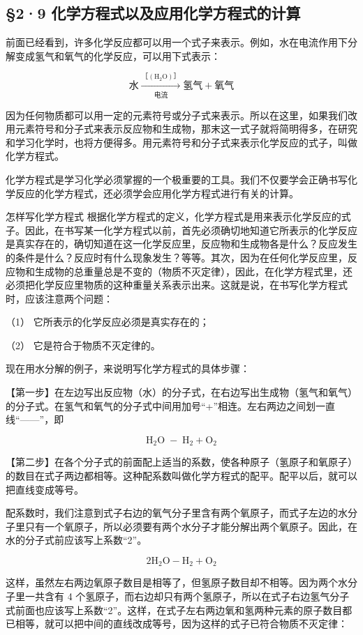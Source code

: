 \subsection{§2·9 化学方程式以及应用化学方程式的计算}

前面已经看到，许多化学反应都可以用一个式子来表示。例如，水在电流作用下分解变成氢气和氧气的化学反应，可以用下式表示：

\[
\text{水} \xrightarrow[\text{电流}]{\text{［}(\mathrm{H}_{2}\mathrm{O})\text{］}} \text{氢气} + \text{氧气} \tag{2}
\]

因为任何物质都可以用一定的元素符号或分子式来表示。所以在这里，如果我们改用元素符号和分子式来表示反应物和生成物，那末这一式子就将简明得多，在研究和学习化学时，也将方便得多。用元素符号和分子式来表示化学反应的式子，叫做化学方程式。

化学方程式是学习化学必须掌握的一个极重要的工具。我们不仅要学会正确书写化学反应的化学方程式，还必须学会应用化学方程式进行有关的计算。

怎样写化学方程式
根据化学方程式的定义，化学方程式是用来表示化学反应的式子。因此，在书写某一化学方程式以前，首先必须确切地知道它所表示的化学反应是真实存在的，确切知道在这一化学反应里，反应物和生成物各是什么？反应发生的条件是什么？反应时有什么现象发生？等等。其次，因为在任何化学反应里，反应物和生成物的总重量总是不变的（物质不灭定律），因此，在化学方程式里，还必须把化学反应里物质的这种重量关系表示出来。这就是说，在书写化学方程式时，应该注意两个问题：

（1） 它所表示的化学反应必须是真实存在的；

（2） 它是符合于物质不灭定律的。

现在用水分解的例子，来说明写化学方程式的具体步骤：

【第一步】在左边写出反应物（水）的分子式，在右边写出生成物（氢气和氧气）的分子式。在氢气和氧气的分子式中间用加号``+''相连。左右两边之间划一直线``------''，即

\[
\mathrm{H}_{2}\mathrm{O}\;-\;\mathrm{H}_{2}+\mathrm{O}_{2}
\]

【第二步】在各个分子式的前面配上适当的系数，使各种原子（氢原子和氧原子）的数目在式子两边都相等。这种配系数叫做化学方程式的配平。配平以后，就可以把直线变成等号。

配系数时，我们注意到式子右边的氧气分子里含有两个氧原子，而式子左边的水分子里只有一个氧原子，所以必须要有两个水分子才能分解出两个氧原子。因此，在水的分子式前应该写上系数``2''。

\[
2 \mathrm{H}_{2} \mathrm{O} - \mathrm{H}_{2} + \mathrm{O}_{2}
\]

这样，虽然左右两边氧原子数目是相等了，但氢原子数目却不相等。因为两个水分子里一共含有
4
个氢原子，而右边却只有两个氢原子，所以在式子右边氢气分子式前面也应该写上系数``2''。这样，在式子左右两边氧和氢两种元素的原子数目都已相等，就可以把中间的直线改成等号，因为这样的式子已符合物质不灭定律：

